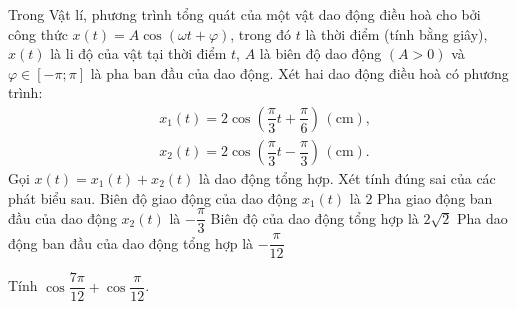 \begin{vd}%
	Trong Vật lí, phương trình tổng quát của một vật dao động điều hoà cho bởi công thức $x(t)=A \cos (\omega t+\varphi)$, trong đó $t$ là thời điểm (tính bằng giây), $x(t)$ là li độ của vật tại thời điểm $t$, $A$ là biên độ dao động $(A>0)$ và $\varphi \in[-\pi ; \pi]$ là pha ban đầu của dao động. Xét hai dao động điều hoà có phương trình:
	$$
	\begin{aligned}
	& x_1(t)=2 \cos \left(\dfrac{\pi}{3} t+\dfrac{\pi}{6}\right)\,(\mathrm{cm}), \\
	& x_2(t)=2 \cos \left(\dfrac{\pi}{3} t-\dfrac{\pi}{3}\right)\,(\mathrm{cm}).
	\end{aligned}
	$$
	Gọi $x(t)=x_1(t)+x_2(t)$ là dao động tổng hợp. Xét tính đúng sai của các phát biểu sau.
	\choiceTF
	{\True Biên độ giao động của dao động $x_1(t)$ là $2$}
	{\True Pha giao động ban đầu của dao động $x_2(t)$ là $-\dfrac{\pi}{3}$}
	{\True Biên độ của dao động tổng hợp là $2\sqrt{2}$}
	{\True Pha dao động ban đầu của dao động tổng hợp là $-\dfrac{\pi}{12}$}
\end{vd}

\begin{bt}%
	Tính $\cos \dfrac{7 \pi}{12} + \cos \dfrac{\pi}{12}$.
\end{bt}

